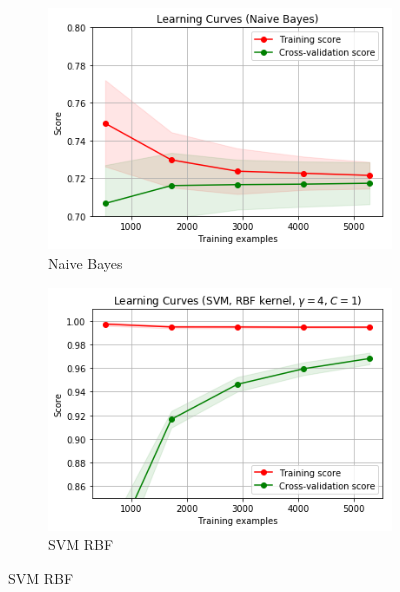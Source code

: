 \begin{figure}[ht!]
\centering
\begin{subfigure}{.5\textwidth}
  \centering
  \includegraphics[width=.8\linewidth]{figures/NB.png}
  \caption{Naive Bayes}
  \label{fig:sub1}
\end{subfigure}%
\begin{subfigure}{.5\textwidth}
  \centering
  \includegraphics[width=.8\linewidth]{figures/SVM-RBF.png}
  \caption{SVM RBF}
  \label{fig:sub2}
\end{subfigure}


\end{figure}
